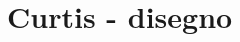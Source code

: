 \documentclass[a4paper, 15pt]{article}
\begin{document}
\newpage
\section{Curtis - disegno}		
\newpage	
\end{document}
